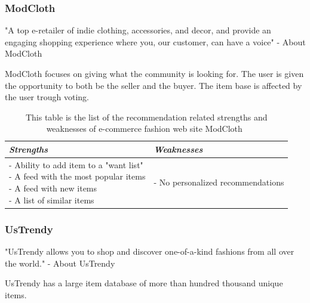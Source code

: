 \subsubsection{ModCloth} %
\label{par:modcloth}
    "A top e-retailer of indie clothing, accessories, and decor, and provide an engaging shopping experience where you, our customer, can have a voice" - About ModCloth~\cite{modcloth}

    ModCloth focuses on giving what the community is looking for.
    The user is given the opportunity to both be the seller and the buyer.
    The item base is affected by the user trough voting.
    \begin{table}[H]
        \centering
        \begin{tabular}{l|l}
            \toprule
            \emph{Strengths} & \emph{Weaknesses} \\ \hline
            \pbox{9cm}{
                - Ability to add item to a "want list" \\
                - A feed with the most popular items \\
                - A feed with new items \\
                - A list of similar items
            } & \pbox{9cm}{
                - No personalized recommendations \\
            } \\ \bottomrule
        \end{tabular}
        \caption[Recommendation related strengths and weaknesses of ModCloth~\cite{ModCloth}]{This table is the list of the recommendation related strengths and weaknesses of e-commerce fashion web site ModCloth~\cite{ModCloth}}
        \label{table:ecommenreceModCloth}
    \end{table}


\subsubsection{UsTrendy} %
\label{par:ustrendy}
    "UsTrendy allows you to shop and discover one-of-a-kind fashions from all over the world." - About UsTrendy~\cite{UsTrendy}

    UsTrendy has a large item database of more than hundred thousand unique items.

